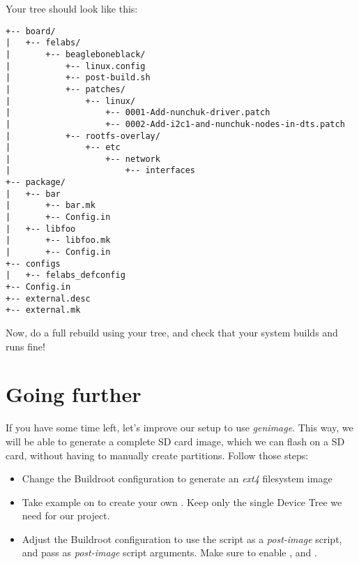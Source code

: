 Your  tree should look like this:

\begin{verbatim}
+-- board/
|   +-- felabs/
|       +-- beagleboneblack/
|           +-- linux.config
|           +-- post-build.sh
|           +-- patches/
|               +-- linux/
|                   +-- 0001-Add-nunchuk-driver.patch
|                   +-- 0002-Add-i2c1-and-nunchuk-nodes-in-dts.patch
|           +-- rootfs-overlay/
|               +-- etc
|                   +-- network
|                       +-- interfaces
+-- package/
|   +-- bar
|       +-- bar.mk
|       +-- Config.in
|   +-- libfoo
|       +-- libfoo.mk
|       +-- Config.in
+-- configs
|   +-- felabs_defconfig
+-- Config.in
+-- external.desc
+-- external.mk
\end{verbatim}

Now, do a full rebuild using your  tree, and check
that your system builds and runs fine!

\section{Going further}

If you have some time left, let's improve our setup to use {\em
  genimage}. This way, we will be able to generate a complete SD card
image, which we can flash on a SD card, without having to manually
create partitions. Follow those steps:

\begin{itemize}

\item Change the Buildroot configuration to generate an {\em ext4}
  filesystem image

\item Take example on  to create
  your own . Keep only
  the single Device Tree we need for our project.

\item Adjust the Buildroot configuration to use the
   script as a {\em post-image}
  script, and pass 
  as {\em post-image} script arguments. Make sure to enable
  , 
  and .

\end{itemize}
